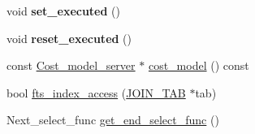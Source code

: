 \begin{DoxyCompactItemize}
\mbox{\label{classJOIN_a4fba0c97939c6c1bff0888c2a561fc33}} 
void {\bfseries set\+\_\+executed} ()
\item 
\mbox{\label{classJOIN_a3f468b303c72a8da7366d8dc43c8db82}} 
void {\bfseries reset\+\_\+executed} ()
\item 
const \mbox{\hyperlink{classCost__model__server}{Cost\+\_\+model\+\_\+server}} $\ast$ \mbox{\hyperlink{classJOIN_ae401f39f0804185f108edebcb639c7dc}{cost\+\_\+model}} () const
\item 
bool \mbox{\hyperlink{group__Query__Optimizer_ga7c20a9b8d13f14275a4ee01f44f8cfa2}{fts\+\_\+index\+\_\+access}} (\mbox{\hyperlink{classJOIN__TAB}{J\+O\+I\+N\+\_\+\+T\+AB}} $\ast$tab)
\item 
Next\+\_\+select\+\_\+func \mbox{\hyperlink{group__Query__Executor_ga8a8f8266528e6e4f33f31333f5f3cd8a}{get\+\_\+end\+\_\+select\+\_\+func}} ()
\end{DoxyCompactItemize}
